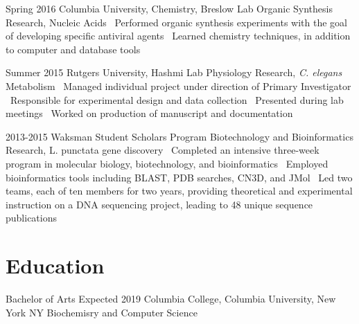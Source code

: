 \documentclass{bscv}
\begin{document}
\begin{eventlist}
\item{Spring 2016}
  {Columbia University, Chemistry, Breslow Lab}
  {Organic Synthesis Research, Nucleic Acids}
  {\textbullet\ Performed organic synthesis experiments with the goal of developing specific antiviral agents \newline \textbullet\ Learned chemistry techniques, in addition to computer and database tools}

\item{Summer 2015}
  {Rutgers University, Hashmi Lab}
  { Physiology Research, \textit{C. elegans} Metabolism}
  {\textbullet\ Managed individual project under direction of Primary Investigator \newline \textbullet\ Responsible for experimental design and data collection \newline \textbullet\  Presented during lab meetings \newline \textbullet \ Worked on production of manuscript and documentation \newline}

  
\item{2013-2015}
  {Waksman Student Scholars Program}
  {Biotechnology and Bioinformatics Research, L. punctata gene discovery}
  {\textbullet\  Completed an intensive three-week program in molecular biology, biotechnology, and bioinformatics \newline \textbullet\  Employed bioinformatics tools including BLAST, PDB searches, CN3D, and JMol \newline \textbullet\  Led two teams, each of ten members for two years, providing theoretical and experimental instruction on a DNA sequencing project, leading to 48 unique sequence publications}
  

\end{eventlist}



\section{Education}

\begin{yearlist}

\item[Bachelor of Arts]{Expected  2019}
  {Columbia College, \newline Columbia University, \newline New York NY} {Biochemisry and \newline Computer Science}

\end{yearlist}
\end{document}
